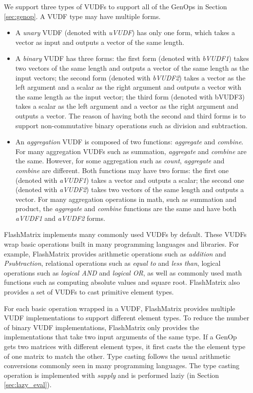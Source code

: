 We support three types of VUDFs to support all of the GenOps in Section
\ref{sec:genop}. A VUDF type may have multiple forms.
\begin{itemize}
	\item A \textit{unary} VUDF (denoted with \textit{uVUDF}) has only one form,
		which takes a vector as input and outputs a vector of the same length.
	\item A \textit{binary} VUDF has three forms: the first form (denoted with
		\textit{bVUDF1}) takes two vectors of the same length and outputs
		a vector of the same length as the input vectors; the second form (denoted
		with \textit{bVUDF2}) takes a vector as the left argument and a scalar
		as the right argument and outputs a vector with the same length as
		the input vector; the third form (denoted with bVUDF3) takes a scalar
		as the left argument and a vector as the right
		argument and outputs a vector. The reason of having both the second and third
		forms is to support non-commutative binary operations such as division and
		subtraction.
	\item An \textit{aggregation} VUDF is composed of two functions:
		\textit{aggregate} and \textit{combine}. For many aggregation VUDFs
		such as summation, \textit{aggregate} and \textit{combine} are the same.
		However, for some aggregation such as \textit{count}, \textit{aggregate}
		and \textit{combine} are different. Both functions may have two forms:
		the first one (denoted with \textit{aVUDF1}) takes a vector and outputs
		a scalar; the second one (denoted with \textit{aVUDF2}) takes two
		vectors of the same length and outputs a vector. For many aggregation
		operations in math, such as summation and product, the \textit{aggregate}
		and \textit{combine} functions are the same and have both \textit{aVUDF1}
		and \textit{aVUDF2} forms.
\end{itemize}

FlashMatrix implements many commonly used VUDFs by default. These VUDFs wrap
basic operations built in many programming languages and libraries. For example,
FlashMatrix provides arithmetic operations such as \textit{addition} and
\textit{Psubtraction}, relational operations such as \textit{equal to} and
\textit{less than}, logical operations such as \textit{logical AND} and
\textit{logical OR}, as well as commonly used math functions such as computing
absolute values and square root. FlashMatrix also provides a set of VUDFs to
cast primitive element types.

For each basic operation wrapped in a VUDF, FlashMatrix provides multiple
VUDF implementations to support different element types. To reduce the number
of binary VUDF implementations,
FlashMatrix only provides the implementations that take two input arguments of
the same type. If a GenOp gets two matrices with different
element types, it first casts the the element type of one matrix to match
the other. Type casting follows the usual arithmetic conversions \cite{}
commonly seen in many programming languages. The type casting operation is
implemented with \textit{sapply} and is performed laziy (in Section
\ref{sec:lazy_eval}).

